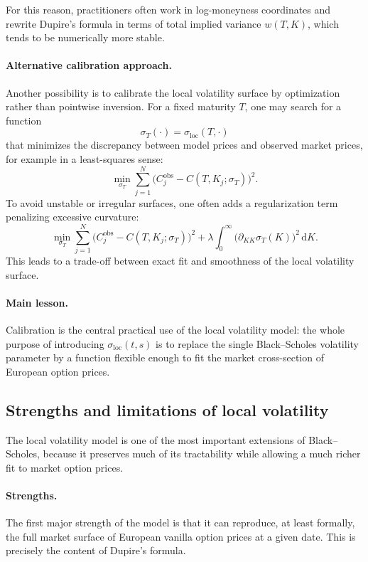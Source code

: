 \documentclass[11pt]{article}
\theoremstyle{plain}
\theoremstyle{definition}
\theoremstyle{remark}
\begin{document}
For this reason, practitioners often work in log-moneyness coordinates
and rewrite Dupire's formula in terms of total implied variance
\(w(T,K)\), which tends to be numerically more stable. 

\paragraph{Alternative calibration approach.}
Another possibility is to calibrate the local volatility surface by
optimization rather than pointwise inversion.
For a fixed maturity \(T\), one may search for a function
\[
\sigma_T(\cdot)=\sigma_{\mathrm{loc}}(T,\cdot)
\]
that minimizes the discrepancy between model prices and observed market
prices, for example in a least-squares sense:
\[
\min_{\sigma_T}
\sum_{j=1}^N
\big(
C_j^{\mathrm{obs}}-C(T,K_j;\sigma_T)
\big)^2.
\]
To avoid unstable or irregular surfaces, one often adds a regularization
term penalizing excessive curvature:
\[
\min_{\sigma_T}
\sum_{j=1}^N
\big(
C_j^{\mathrm{obs}}-C(T,K_j;\sigma_T)
\big)^2
+
\lambda\int_0^\infty
\big(\partial_{KK}\sigma_T(K)\big)^2\,\mathrm{d}K.
\]
This leads to a trade-off between exact fit and smoothness of the local
volatility surface.

\paragraph{Main lesson.}
Calibration is the central practical use of the local volatility model:
the whole purpose of introducing \(\sigma_{\mathrm{loc}}(t,s)\) is to
replace the single Black--Scholes volatility parameter by a function
flexible enough to fit the market cross-section of European option
prices.

\subsection{Strengths and limitations of local volatility}

The local volatility model is one of the most important extensions of
Black--Scholes, because it preserves much of its tractability while
allowing a much richer fit to market option prices.

\paragraph{Strengths.}

The first major strength of the model is that it can reproduce, at least
formally, the full market surface of European vanilla option prices at a
given date.
This is precisely the content of Dupire's formula.
\end{document}
